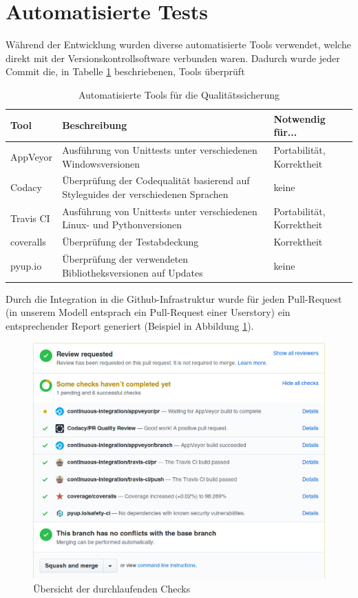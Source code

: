 \documentclass[accentcolor=tud9c,12pt,paper=a4]{tudreport}
\begin{document}
	\section{Automatisierte Tests}
	Während der Entwicklung wurden diverse automatisierte Tools verwendet, welche direkt mit der Versionskontrollsoftware
	verbunden waren. Dadurch wurde jeder Commit die, in Tabelle \ref{qs_tools} beschriebenen, Tools überprüft
	\begin{table}[H]
		\centering
		\begin{tabular}{|l|p{18em}|l|}
			\hline
			\textbf{Tool} & \textbf{Beschreibung} & \textbf{Notwendig für...} \\\hline
			AppVeyor & Ausführung von Unittests unter verschiedenen Windowsversionen & Portabilität, Korrektheit \\\hline
			Codacy & Überprüfung der Codequalität basierend auf Styleguides der verschiedenen Sprachen& keine \\\hline
			Travis CI & Ausführung von Unittests unter verschiedenen Linux- und Pythonversionen & Portabilität, Korrektheit \\\hline
			coveralls & Überprüfung der Testabdeckung & Korrektheit \\\hline
			pyup.io & Überprüfung der verwendeten Bibliotheksversionen auf Updates & keine \\\hline
		\end{tabular}
		\caption{Automatisierte Tools für die Qualitätssicherung}
		\label{qs_tools}
	\end{table}

	Durch die Integration in die Github-Infrastruktur wurde für jeden Pull-Request (in unserem Modell entsprach ein Pull-Request einer Userstory)
	ein entsprechender Report generiert (Beispiel in Abbildung \ref{github_checks}).

	\begin{figure}[h]
		\centering
		\includegraphics[width=.7\textwidth]{github_checks}
		\caption{Übersicht der durchlaufenden Checks}
		\label{github_checks}
	\end{figure}
\end{document}

